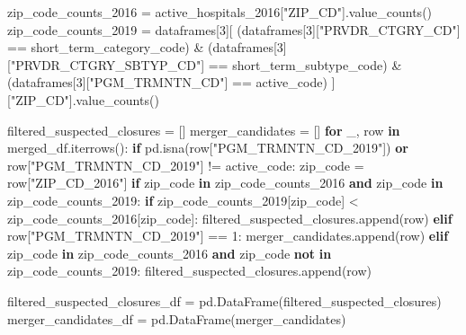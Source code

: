 \documentclass[
  letterpaper,
  DIV=11,
  numbers=noendperiod]{scrartcl}
\newenvironment{Shaded}{\begin{snugshade}}{\end{snugshade}}
\newcommand{\ControlFlowTok}[1]{\textcolor[rgb]{0.00,0.23,0.31}{\textbf{#1}}}
\newcommand{\DecValTok}[1]{\textcolor[rgb]{0.68,0.00,0.00}{#1}}
\newcommand{\KeywordTok}[1]{\textcolor[rgb]{0.00,0.23,0.31}{\textbf{#1}}}
\newcommand{\NormalTok}[1]{\textcolor[rgb]{0.00,0.23,0.31}{#1}}
\newcommand{\OperatorTok}[1]{\textcolor[rgb]{0.37,0.37,0.37}{#1}}
\newcommand{\StringTok}[1]{\textcolor[rgb]{0.13,0.47,0.30}{#1}}
\begin{document}
\begin{Shaded}
\begin{Highlighting}[]
\NormalTok{zip\_code\_counts\_2016 }\OperatorTok{=}\NormalTok{ active\_hospitals\_2016[}\StringTok{"ZIP\_CD"}\NormalTok{].value\_counts()}
\NormalTok{zip\_code\_counts\_2019 }\OperatorTok{=}\NormalTok{ dataframes[}\DecValTok{3}\NormalTok{][}
\NormalTok{    (dataframes[}\DecValTok{3}\NormalTok{][}\StringTok{"PRVDR\_CTGRY\_CD"}\NormalTok{] }\OperatorTok{==}\NormalTok{ short\_term\_category\_code)}
    \OperatorTok{\&}\NormalTok{ (dataframes[}\DecValTok{3}\NormalTok{][}\StringTok{"PRVDR\_CTGRY\_SBTYP\_CD"}\NormalTok{] }\OperatorTok{==}\NormalTok{ short\_term\_subtype\_code)}
    \OperatorTok{\&}\NormalTok{ (dataframes[}\DecValTok{3}\NormalTok{][}\StringTok{"PGM\_TRMNTN\_CD"}\NormalTok{] }\OperatorTok{==}\NormalTok{ active\_code)}
\NormalTok{][}\StringTok{"ZIP\_CD"}\NormalTok{].value\_counts()}

\NormalTok{filtered\_suspected\_closures }\OperatorTok{=}\NormalTok{ []}
\NormalTok{merger\_candidates }\OperatorTok{=}\NormalTok{ []}
\ControlFlowTok{for}\NormalTok{ \_, row }\KeywordTok{in}\NormalTok{ merged\_df.iterrows():}
    \ControlFlowTok{if}\NormalTok{ pd.isna(row[}\StringTok{"PGM\_TRMNTN\_CD\_2019"}\NormalTok{]) }\KeywordTok{or}\NormalTok{ row[}\StringTok{"PGM\_TRMNTN\_CD\_2019"}\NormalTok{] }\OperatorTok{!=}\NormalTok{ active\_code:}
\NormalTok{        zip\_code }\OperatorTok{=}\NormalTok{ row[}\StringTok{"ZIP\_CD\_2016"}\NormalTok{]}
        \ControlFlowTok{if}\NormalTok{ zip\_code }\KeywordTok{in}\NormalTok{ zip\_code\_counts\_2016 }\KeywordTok{and}\NormalTok{ zip\_code }\KeywordTok{in}\NormalTok{ zip\_code\_counts\_2019:}
            \ControlFlowTok{if}\NormalTok{ zip\_code\_counts\_2019[zip\_code] }\OperatorTok{\textless{}}\NormalTok{ zip\_code\_counts\_2016[zip\_code]:}
\NormalTok{                filtered\_suspected\_closures.append(row)}
            \ControlFlowTok{elif}\NormalTok{ row[}\StringTok{"PGM\_TRMNTN\_CD\_2019"}\NormalTok{] }\OperatorTok{==} \DecValTok{1}\NormalTok{:}
\NormalTok{                merger\_candidates.append(row)}
        \ControlFlowTok{elif}\NormalTok{ zip\_code }\KeywordTok{in}\NormalTok{ zip\_code\_counts\_2016 }\KeywordTok{and}\NormalTok{ zip\_code }\KeywordTok{not} \KeywordTok{in}\NormalTok{ zip\_code\_counts\_2019:}
\NormalTok{            filtered\_suspected\_closures.append(row)}

\NormalTok{filtered\_suspected\_closures\_df }\OperatorTok{=}\NormalTok{ pd.DataFrame(filtered\_suspected\_closures)}
\NormalTok{merger\_candidates\_df }\OperatorTok{=}\NormalTok{ pd.DataFrame(merger\_candidates)}


\end{Highlighting}
\end{Shaded}
\end{document}
